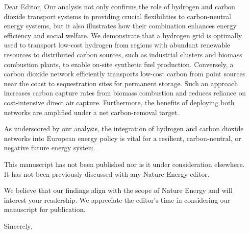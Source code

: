 \documentclass[12pt]{SHUletter}
\begin{document}
\begin{letter}{Dear Editor,}
		Our analysis not only confirms the role of hydrogen and carbon dioxide transport systems in providing crucial flexibilities to carbon-neutral energy systems, but it also illustrates how their combination enhances energy efficiency and social welfare. We demonstrate that a hydrogen grid is optimally used to transport low-cost hydrogen from regions with abundant renewable resources to distributed carbon sources, such as industrial clusters and biomass combustion plants, to enable on-site synthetic fuel production. Conversely, a carbon dioxide network efficiently transports low-cost carbon from point sources near the coast to sequestration sites for permanent storage. Such an approach increases carbon capture rates from biomass combustion and reduces reliance on cost-intensive direct air capture. Furthermore, the benefits of deploying both networks are amplified under a net carbon-removal target.

		As underscored by our analysis, the integration of hydrogen and carbon dioxide networks into European energy policy is vital for a resilient, carbon-neutral, or negative future energy system.

		This manuscript has not been published nor is it under consideration elsewhere. It has not been previously discussed with any Nature Energy editor.

		We believe that our findings align with the scope of Nature Energy and will interest your readership. We appreciate the editor's time in considering our manuscript for publication.

		\closing{Sincerely,}
	\end{letter}
\end{document}
